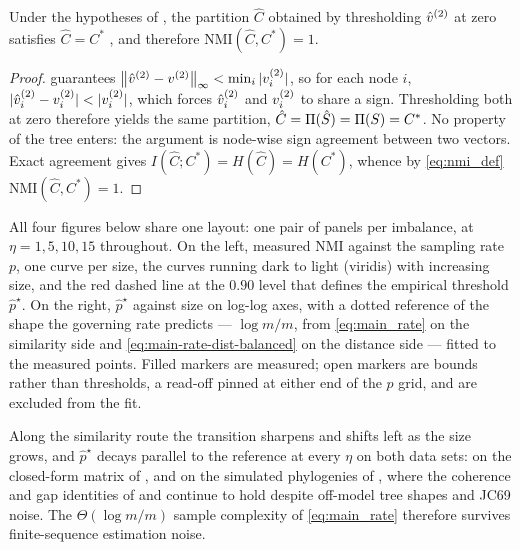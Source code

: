 \begin{corollary}[Perfect partition recovery and $\mathrm{NMI}=1$]\label{cor:nmi}
Under the hypotheses of , the partition $\hat C$ obtained by thresholding $\hat v^{(2)}$ at zero satisfies $\hat C=C^\ast$ \hp, and therefore $\mathrm{NMI}(\hat C,C^\ast)=1$.
\end{corollary}
\begin{proof}
 guarantees $\left\lVert \hat v^{(2)}-v^{(2)} \right\rVert_\infty<\min_i|v^{(2)}_i|$, so for each node $i$, $|\vvh_i-\vv_i|<|\vv_i|$, which forces $\hat v^{(2)}_i$ and $v^{(2)}_i$ to share a sign. Thresholding both at zero therefore yields the same partition, $\hat C=\Pi(\hat S)=\Pi(S)=C^\ast$. No property of the tree enters: the argument is node-wise sign agreement between two vectors. Exact agreement gives $I(\hat C;C^\ast)=H(\hat C)=H(C^\ast)$, whence by \eqref{eq:nmi_def} $\mathrm{NMI}(\hat C,C^\ast)=1$.
\end{proof}

All four figures below share one layout: one pair of panels per imbalance, at $\eta=1,5,10,15$ throughout. On the left, measured NMI against the sampling rate $p$, one curve per size, the curves running dark to light (viridis) with increasing size, and the red dashed line at the $0.90$ level that defines the empirical threshold $\hat p^\star$. On the right, $\hat p^\star$ against size on log-log axes, with a dotted reference of the shape the governing rate predicts --- $\log m/m$, from \eqref{eq:main_rate} on the similarity side and \eqref{eq:main-rate-dist-balanced} on the distance side --- fitted to the measured points. Filled markers are measured; open markers are bounds rather than thresholds, a read-off pinned at either end of the $p$ grid, and are excluded from the fit.

Along the similarity route the transition sharpens and shifts left as the size grows, and $\hat p^\star$ decays parallel to the reference at every $\eta$ on both data sets: on the closed-form matrix of , and on the simulated phylogenies of , where the coherence and gap identities of  and  continue to hold despite off-model tree shapes and JC69 noise. The $\Theta(\log m/m)$ sample complexity of \eqref{eq:main_rate} therefore survives finite-sequence estimation noise.

